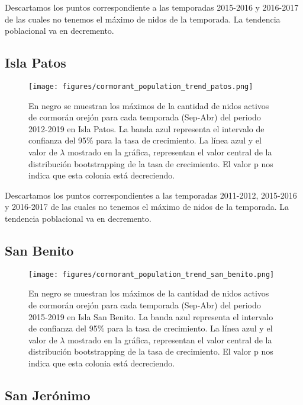\documentclass{article} %
\begin{document}
Descartamos los puntos correspondiente a las temporadas 2015-2016 y 2016-2017 de las cuales no tenemos el máximo de nidos de la temporada. La tendencia poblacional va en decremento.


\subsection*{Isla Patos}

\begin{figure}[H]
\hspace{-2cm}
    \texttt{[image: figures/cormorant\_population\_trend\_patos.png]}
\caption{En negro se muestran los máximos de la cantidad de nidos activos de cormorán orejón para cada temporada (Sep-Abr) del periodo 2012-2019 en Isla Patos. La banda azul representa el intervalo de confianza del 95\% para la tasa de crecimiento. La línea azul y el valor de $\lambda$ mostrado en la gráfica, representan el valor central de la distribución bootstrapping de la tasa de crecimiento. El valor p nos indica que esta colonia está decreciendo.}
\end{figure}

Descartamos los puntos correspondientes a las temporadas 2011-2012, 2015-2016 y 2016-2017 de las cuales no tenemos el máximo de nidos de la temporada. La tendencia poblacional va en decremento.

\subsection*{San Benito}

\begin{figure}[H]
\hspace{-2cm}
    \texttt{[image: figures/cormorant\_population\_trend\_san\_benito.png]}
\caption{En negro se muestran los máximos de la cantidad de nidos activos de cormorán orejón para cada temporada (Sep-Abr) del periodo 2015-2019 en Isla San Benito. La banda azul representa el intervalo de confianza del 95\% para la tasa de crecimiento. La línea azul y el valor de $\lambda$ mostrado en la gráfica, representan el valor central de la distribución bootstrapping de la tasa de crecimiento. El valor p nos indica que esta colonia está decreciendo.}
\end{figure}

\subsection*{San Jerónimo}
\end{document}
